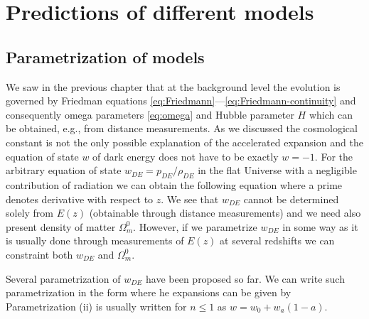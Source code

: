 \section{Predictions of different models}

\subsection{Parametrization of models}
We saw in the previous chapter that at the background level the evolution is governed by Friedman equations \eqref{eq:Friedmann}---\eqref{eq:Friedmann-continuity} and consequently omega parameters \eqref{eq:omega} and Hubble parameter $H$ which can be obtained, e.g., from distance measurements. As we discussed the cosmological constant is not the only possible explanation of the accelerated expansion and the equation of state \(w\) of dark energy does not have to be exactly \(w=-1\). For the arbitrary equation of state $w_{DE}=p_{DE}/\rho_{DE}$ in the flat Universe with a negligible contribution of radiation we can obtain the following equation
where a prime denotes derivative with respect to \(z\). We see that \(w_{DE}\) cannot be determined solely from \(E(z)\) (obtainable through distance measurements) and we need also present density of matter \(\Omega_m^0\). However, if we parametrize \(w_{DE}\) in some way as it is usually done through measurements of \(E(z)\) at several redshifts we can constraint both \(w_{DE}\) and \(\Omega_m^0\).

Several parametrization  of \(w_{DE}\) have been proposed so far. We can write such parametrization  in the form
where he expansions can be given by
Parametrization (ii) is usually written for \(n\leq1\) as \(w=w_0+w_a(1-a)\).

